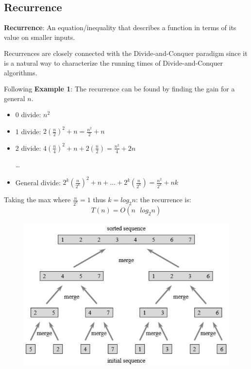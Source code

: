 \documentclass[10pt,a4paper]{article}
\begin{document}
\subsection{Recurrence}

\begin{tcolorbox}[breakable,colback=white]
\textbf{Recurrence}: An equation/inequality that describes a function in terms of its value on
smaller inputs. 
\end{tcolorbox}

Recurrences are closely connected with the Divide-and-Conquer paradigm since it is a natural way to
characterize the running times of Divide-and-Conquer algorithms. \par 

Following \textbf{Example 1}: The recurrence can be found by finding the gain for a general $n$.
\begin{itemize}
    \item 0 divide: $n^2$
    \item 1 divide: $2\left(\frac{n}{2}\right)^2 + n = \frac{n^2}{2}+n$
    \item 2 divide: $4\left(\frac{n}{4}\right)^2 + n + 2\left(\frac{n}{2}\right)=\frac{n^2}{4}+2n$
    \par 
    \dots
    \item General divide: $2^k\left(\frac{n}{2^k}\right)^2 + n + \dots + 2^k\left(\frac{n}{2^k}\right)=\frac{n^2}{2^k}+nk$
\end{itemize}
Taking the max where $\frac{n}{2^k}=1$ thus $k=log_2n$: the recurrence is:
$$
    T(n)=O(n\text{ }log_2n)
$$

\begin{figure} [h!]
    \centering
    \includegraphics[scale=0.7]{DAC.JPG}
    \caption{}
\end{figure}
\end{document}
